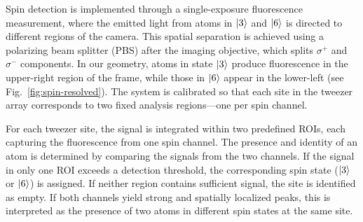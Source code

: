 



Spin detection is implemented through a single-exposure fluorescence measurement, where the emitted light from atoms in $\left| 3 \right\rangle$ and $\left| 6 \right\rangle$ is directed to different regions of the camera. This spatial separation is achieved using a polarizing beam splitter (PBS) after the imaging objective, which splits $\sigma^+$ and $\sigma^-$ components. In our geometry, atoms in state $\left| 3 \right\rangle$ produce fluorescence in the upper-right region of the frame, while those in $\left| 6 \right\rangle$ appear in the lower-left (see Fig.~\ref{fig:spin-resolved}). The system is calibrated so that each site in the tweezer array corresponds to two fixed analysis regions—one per spin channel.

For each tweezer site, the signal is integrated within two predefined ROIs, each capturing the fluorescence from one spin channel. The presence and identity of an atom is determined by comparing the signals from the two channels. If the signal in only one ROI exceeds a detection threshold, the corresponding spin state ($\left| 3 \right\rangle$ or $\left| 6 \right\rangle$) is assigned. If neither region contains sufficient signal, the site is identified as empty. If both channels yield strong and spatially localized peaks, this is interpreted as the presence of two atoms in different spin states at the same site.

